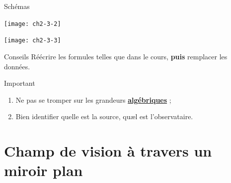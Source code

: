 \documentclass[../main/main.tex]{subfiles}
\begin{document}
\begin{NCexem}[sidebyside]{Schémas}
    \begin{center}
        \texttt{[image: ch2-3-2]}
    \end{center} 
    \tcblower
    \begin{center}
        \texttt{[image: ch2-3-3]}
    \end{center} 
\end{NCexem}

\begin{tcbraster}[raster columns=5, raster equal height=rows]
    \begin{NCcoro}[raster multicolumn=2]{Conseils}
        Réécrire les formules telles que dans le cours, \textbf{puis} remplacer
        les données.%
    \end{NCcoro}    
    \begin{NCimpo}[raster multicolumn=3]{Important}
        \begin{enumerate}
            \item Ne pas se tromper sur les grandeurs
                \underline{\textbf{algébriques}} ;\vspace{-8pt}
            \item Bien identifier quelle est la source, quæl est l'observataire.
        \end{enumerate}
    \end{NCimpo}
\end{tcbraster}

\newpage

\section{Champ de vision à travers un miroir plan}
\end{document}
